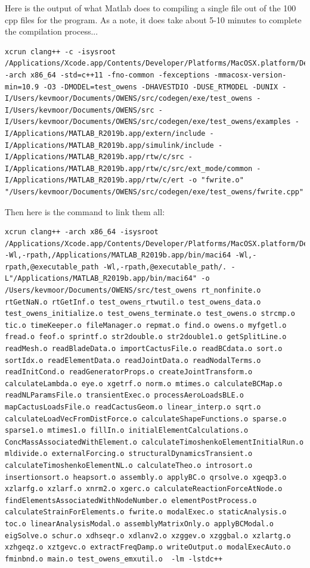 \documentclass{article}
\begin{document}
Here is the output of what Matlab does to compiling a single file out of the 100 cpp files for the program.  As a note, it does take about 5-10 minutes to complete the compilation process...

\begin{lstlisting}
xcrun clang++ -c -isysroot /Applications/Xcode.app/Contents/Developer/Platforms/MacOSX.platform/Developer/SDKs/MacOSX10.13.sdk -arch x86_64 -std=c++11 -fno-common -fexceptions -mmacosx-version-min=10.9 -O3 -DMODEL=test_owens -DHAVESTDIO -DUSE_RTMODEL -DUNIX -I/Users/kevmoor/Documents/OWENS/src/codegen/exe/test_owens -I/Users/kevmoor/Documents/OWENS/src -I/Users/kevmoor/Documents/OWENS/src/codegen/exe/test_owens/examples -I/Applications/MATLAB_R2019b.app/extern/include -I/Applications/MATLAB_R2019b.app/simulink/include -I/Applications/MATLAB_R2019b.app/rtw/c/src -I/Applications/MATLAB_R2019b.app/rtw/c/src/ext_mode/common -I/Applications/MATLAB_R2019b.app/rtw/c/ert -o "fwrite.o" "/Users/kevmoor/Documents/OWENS/src/codegen/exe/test_owens/fwrite.cpp"
\end{lstlisting}

Then here is the command to link them all:

\begin{lstlisting}
xcrun clang++ -arch x86_64 -isysroot /Applications/Xcode.app/Contents/Developer/Platforms/MacOSX.platform/Developer/SDKs/MacOSX10.13.sdk -Wl,-rpath,/Applications/MATLAB_R2019b.app/bin/maci64 -Wl,-rpath,@executable_path -Wl,-rpath,@executable_path/. -L"/Applications/MATLAB_R2019b.app/bin/maci64" -o /Users/kevmoor/Documents/OWENS/src/test_owens rt_nonfinite.o rtGetNaN.o rtGetInf.o test_owens_rtwutil.o test_owens_data.o test_owens_initialize.o test_owens_terminate.o test_owens.o strcmp.o tic.o timeKeeper.o fileManager.o repmat.o find.o owens.o myfgetl.o fread.o feof.o sprintf.o str2double.o str2double1.o getSplitLine.o readMesh.o readBladeData.o importCactusFile.o readBCdata.o sort.o sortIdx.o readElementData.o readJointData.o readNodalTerms.o readInitCond.o readGeneratorProps.o createJointTransform.o calculateLambda.o eye.o xgetrf.o norm.o mtimes.o calculateBCMap.o readNLParamsFile.o transientExec.o processAeroLoadsBLE.o mapCactusLoadsFile.o readCactusGeom.o linear_interp.o sqrt.o calculateLoadVecFromDistForce.o calculateShapeFunctions.o sparse.o sparse1.o mtimes1.o fillIn.o initialElementCalculations.o ConcMassAssociatedWithElement.o calculateTimoshenkoElementInitialRun.o mldivide.o externalForcing.o structuralDynamicsTransient.o calculateTimoshenkoElementNL.o calculateTheo.o introsort.o insertionsort.o heapsort.o assembly.o applyBC.o qrsolve.o xgeqp3.o xzlarfg.o xzlarf.o xnrm2.o xgerc.o calculateReactionForceAtNode.o findElementsAssociatedWithNodeNumber.o elementPostProcess.o calculateStrainForElements.o fwrite.o modalExec.o staticAnalysis.o toc.o linearAnalysisModal.o assemblyMatrixOnly.o applyBCModal.o eigSolve.o schur.o xdhseqr.o xdlanv2.o xzggev.o xzggbal.o xzlartg.o xzhgeqz.o xztgevc.o extractFreqDamp.o writeOutput.o modalExecAuto.o fminbnd.o main.o test_owens_emxutil.o  -lm -lstdc++
\end{lstlisting}
\end{document}
